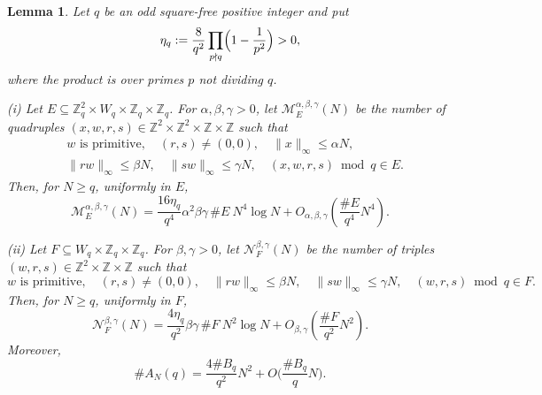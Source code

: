 \documentclass[11pt,reqno]{amsart}
\newtheorem{lemma}[theorem]{Lemma}
\numberwithin{equation}{section}
\newcommand{\norm}[1]{\lVert #1\rVert_\infty}
\renewcommand{\le}{\leqslant}
\renewcommand{\ge}{\geqslant}
\begin{document}
\begin{lemma}\label{lm:lifting}
Let $q$ be an odd square-free positive integer and put
\[ \eta_q:=\frac8{q^2}\prod_{p\nmid q}\Bigl(1-\frac1{p^2}\Bigr)>0, \]
where the product is over primes $p$ not dividing $q$.

\emph{(i)} Let
$E\subseteq\mathbb{Z}_q^2\times W_q\times\mathbb{Z}_q\times\mathbb{Z}_q$. For $\alpha,\beta,\gamma>0$, let $\mathcal{M}_E^{\alpha,\beta,\gamma}(N)$ be the number of quadruples $(x,w,r,s)\in\mathbb{Z}^2\times\mathbb{Z}^2\times\mathbb{Z}\times\mathbb{Z}$ such that
\begin{align*}
& w\text{ is primitive},\quad (r,s)\ne(0,0),\quad \norm{x}\le\alpha N,\\
& \norm{rw}\le\beta N,
\quad \norm{sw}\le\gamma N,
\quad (x,w,r,s)\bmod q\in E.
\end{align*}
Then, for $N\ge q$, uniformly in $E$,
\begin{equation}\label{eq:unifiedlifting}
\mathcal{M}_E^{\alpha,\beta,\gamma}(N)
=\frac{16\eta_q}{q^4}\alpha^2\beta\gamma\,\#E\ N^4\log N
+O_{\alpha,\beta,\gamma}\!\left(\frac{\#E}{q^4}N^4\right).
\end{equation}

\emph{(ii)} Let $F\subseteq W_q\times\mathbb{Z}_q\times\mathbb{Z}_q$. For $\beta,\gamma>0$, let $\mathcal{N}_F^{\beta,\gamma}(N)$ be the number of triples $(w,r,s)\in\mathbb{Z}^2\times\mathbb{Z}\times\mathbb{Z}$ such that
\[ w\text{ is primitive},\quad (r,s)\ne(0,0),\quad
\norm{rw}\le\beta N,
\quad \norm{sw}\le\gamma N,
\quad (w,r,s)\bmod q\in F. \]
Then, for $N\ge q$, uniformly in $F$,
\begin{equation}\label{eq:pinnedlifting}
\mathcal{N}_F^{\beta,\gamma}(N)
=\frac{4\eta_q}{q^2}\beta\gamma\,\#F\ N^2\log N +O_{\beta,\gamma}\left(\frac{\#F}{q^2}N^2\right).
\end{equation}
Moreover,
\begin{equation}\label{eq:ANuniform}
\#A_N(q)=\frac{4\#B_q}{q^2}N^2 + O\biggl(\frac{\#B_q}{q}N\biggr).
\end{equation}
\end{lemma}
\end{document}

